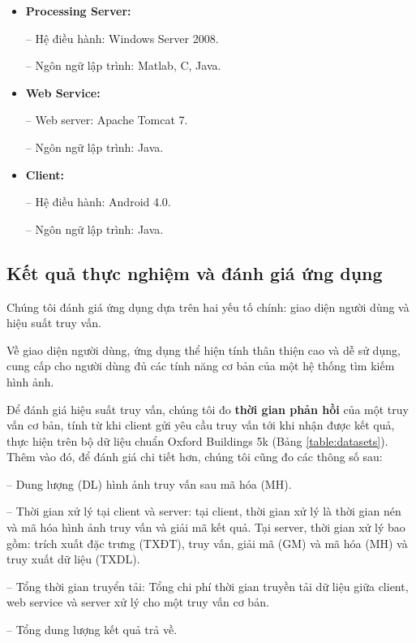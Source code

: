 	\begin{itemize}
	\item \textbf{Processing Server:}
	
	-- Hệ điều hành: Windows Server 2008.
	
	-- Ngôn ngữ lập trình: Matlab, C, Java.
	
	\item \textbf{Web Service:}
	
	-- Web server: Apache Tomcat 7.
	
	-- Ngôn ngữ lập trình: Java.
	
	\item \textbf{Client:}
	
	-- Hệ điều hành: Android 4.0.
	
	-- Ngôn ngữ lập trình: Java. 
	\end{itemize}	
	
	\subsection{Kết quả thực nghiệm và đánh giá ứng dụng}
	Chúng tôi đánh giá ứng dụng dựa trên hai yếu tố chính: giao diện người dùng và hiệu suất truy vấn.
	
	Về giao diện người dùng, ứng dụng thể hiện tính thân thiện cao và dễ sử dụng, cung cấp cho người dùng đủ các tính năng cơ bản của một hệ thống tìm kiếm hình ảnh.
	
	Để đánh giá hiệu suất truy vấn, chúng tôi đo \textbf{thời gian phản hồi} của một truy vấn cơ bản, tính từ khi client gửi yêu cầu truy vấn tới khi nhận được kết quả, thực hiện trên bộ dữ liệu chuẩn Oxford Buildings 5k (Bảng \ref{table:datasets}). Thêm vào đó, để đánh giá chi tiết hơn, chúng tôi cũng đo các thông số sau:
	
	-- Dung lượng (DL) hình ảnh truy vấn sau mã hóa (MH).
	
	-- Thời gian xử lý tại client và server: tại client, thời gian xử lý là thời gian nén và mã hóa hình ảnh truy vấn và giải mã kết quả. Tại server, thời gian xử lý bao gồm: trích xuất đặc trưng (TXĐT), truy vấn, giải mã (GM) và mã hóa (MH) và truy xuất dữ liệu (TXDL).
	
	-- Tổng thời gian truyển tải: Tổng chi phí thời gian truyền tải dữ liệu giữa client, web service và server xử lý cho một truy vấn cơ bản.
	
	-- Tổng dung lượng kết quả trả về.
	
